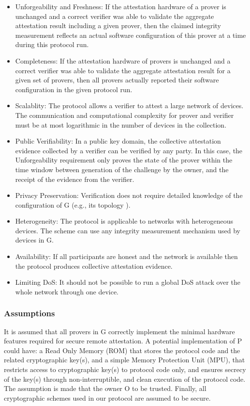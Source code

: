 \documentclass{article}
\begin{document}
\begin{itemize}
\item Unforgeability and Freshness: If the attestation hardware of a prover is unchanged and a correct verifier was able to validate the aggregate attestation result including a given prover, then the claimed integrity measurement reflects an actual software configuration of this prover at a time during this protocol run.
\item Completeness: If the attestation hardware of provers is unchanged and a correct verifier was able to validate the aggregate attestation result for a given set of provers, then all provers actually reported their software configuration in the given protocol run.
\item Scalablity: The protocol allows a verifier to attest a large network of devices. The communication and computational complexity for prover and verifier must be at most logarithmic in the number of devices in the collection.
\item Public Verifiability: In a public key domain, the collective attestation evidence collected by a verifier can be verified by any party. In this case, the Unforgeability requirement only proves the state of the prover within the time window between generation of the challenge by the owner, and the receipt of the evidence from the verifier.
\item Privacy Preservation: Verification does not require detailed knowledge of the configuration of G (e.g., its topology ).
\item Heterogeneity: The protocol is applicable to networks with heterogeneous devices. The scheme can use any integrity measurement mechanism used by devices in G.
\item Availability: If all participants are honest and the network is available then the protocol produces collective attestation evidence.
\item Limiting DoS: It should not be possible to run a global DoS attack over the whole network through one device.
\end{itemize}

\subsubsection{Assumptions}

It is assumed that all provers in G correctly implement the minimal hardware features required for secure remote attestation. A potential implementation of P could have: a Read Only Memory (ROM) that stores the protocol code and the related cryptographic key(s), and a simple Memory Protection Unit (MPU), that restricts access to cryptographic key(s) to protocol code only, and ensures secrecy of the key(s) through non-interruptible, and clean execution of the protocol code. The assumption is made that the owner O to be trusted. Finally,  all cryptographic schemes used in our protocol are assumed to be secure.
\end{document}
